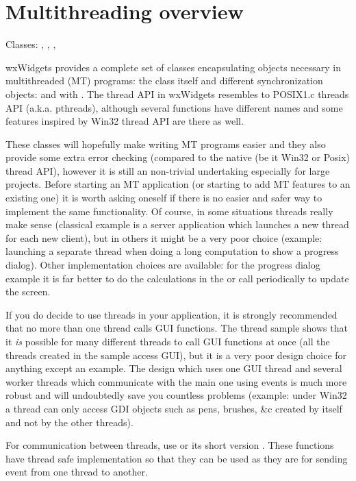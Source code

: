 \section{Multithreading overview}\label{wxthreadoverview}

Classes: , , 
, 

wxWidgets provides a complete set of classes encapsulating objects necessary in
multithreaded (MT) programs: the  class itself and different
synchronization objects:  and 
 with 
. The thread API in wxWidgets resembles to
POSIX1.c threads API (a.k.a. pthreads), although several functions have
different names and some features inspired by Win32 thread API are there as
well.

These classes will hopefully make writing MT programs easier and they also
provide some extra error checking (compared to the native (be it Win32 or Posix)
thread API), however it is still an non-trivial undertaking especially for large
projects. Before starting an MT application (or starting to add MT features to
an existing one) it is worth asking oneself if there is no easier and safer way
to implement the same functionality. Of course, in some situations threads
really make sense (classical example is a server application which launches a
new thread for each new client), but in others it might be a very poor choice
(example: launching a separate thread when doing a long computation to show a
progress dialog). Other implementation choices are available: for the progress
dialog example it is far better to do the calculations in the 
 or call  
periodically to update the screen.

If you do decide to use threads in your application, it is strongly recommended
that no more than one thread calls GUI functions. The thread sample shows that
it {\it is} possible for many different threads to call GUI functions at once
(all the threads created in the sample access GUI), but it is a very poor design
choice for anything except an example. The design which uses one GUI thread and
several worker threads which communicate with the main one using events is much
more robust and will undoubtedly save you countless problems (example: under
Win32 a thread can only access GDI objects such as pens, brushes, \&c created by
itself and not by the other threads).

For communication between threads, use 
or its short version . These functions
have thread safe implementation so that they can be used as they are for
sending event from one thread to another.


